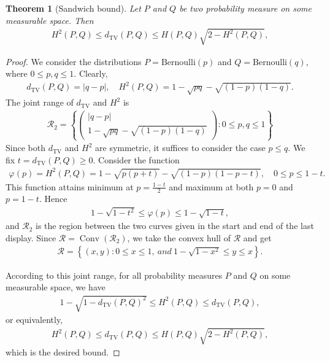 \documentclass{article}
\numberwithin{equation}{section}
\renewcommand{\cal}{\mathcal}
\DeclareMathOperator{\conv}{Conv}
\theoremstyle{plain}
\newtheorem{theorem}{Theorem}[section]
\theoremstyle{definition}
\begin{document}
\begin{theorem}[Sandwich bound]
Let $P$ and $Q$ be two probability measure on some measurable space. Then
\begin{align*}
	H^2(P,Q)\leq d_\mathrm{TV}(P,Q)\leq H(P,Q)\sqrt{2-H^2(P,Q)},
\end{align*}
\end{theorem}
\begin{proof}
We consider the distributions $P=\mathrm{Bernoulli}(p)$ and $Q=\mathrm{Bernoulli}(q)$, where $0\leq p,q\leq 1$. Clearly,
\begin{align*}
	d_\mathrm{TV}(P,Q)=\vert q-p\vert,\quad H^2(P,Q)=1-\sqrt{pq}-\sqrt{(1-p)(1-q)}.
\end{align*} 
The joint range of $d_{\mathrm{TV}}$ and $H^2$ is
\begin{align*}
	\cal{R}_2=\left\{\begin{pmatrix}
		\vert q-p\vert\\ 1-\sqrt{pq}-\sqrt{(1-p)(1-q)}
	\end{pmatrix}:0\leq p,q\leq 1\right\}
\end{align*}
Since both $d_\mathrm{TV}$ and $H^2$ are symmetric, it suffices to consider the case $p\leq q$. We fix $t=d_\mathrm{TV}(P,Q)\geq 0$. Consider the function
\begin{align*}
	\varphi(p)=H^2(P,Q)=1-\sqrt{p(p+t)}-\sqrt{(1-p)(1-p-t)},\quad 0\leq p\leq 1-t.
\end{align*}
This function attains minimum at $p=\frac{1-t}{2}$ and maximum at both $p=0$ and $p=1-t$. Hence
\begin{align*}
1-\sqrt{1-t^2}\leq \varphi(p)\leq 1-\sqrt{1-t},
\end{align*}
and $\cal{R}_2$ is the region between the two curves given in the start and end of the last display. Since $\cal{R}=\conv(\cal{R}_2)$, we take the convex hull of $\cal{R}$ and get
\begin{align*}
	\cal{R}=\left\{(x,y):0\leq x\leq 1,\ and\ 1-\sqrt{1-x^2}\leq y\leq x\right\}.
\end{align*} 

According to this joint range, for all probability measures $P$ and $Q$ on some measurable space, we have
\begin{align*}
	1-\sqrt{1-d_\mathrm{TV}(P,Q)^2}\leq H^2(P,Q)\leq d_\mathrm{TV}(P,Q),
\end{align*}
or equivalently,
\begin{align*}
	H^2(P,Q)\leq d_\mathrm{TV}(P,Q)\leq H(P,Q)\sqrt{2-H^2(P,Q)},
\end{align*}
which is the desired bound.
\end{proof}
\end{document}
